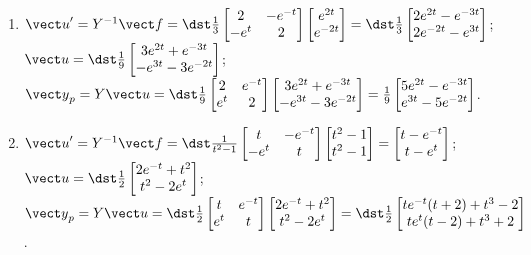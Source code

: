 \documentclass[openany]{book}
\newenvironment{sectionSolutions}{
 \begin{enumerate}[item-label={\thesection.\arabic{enumi}.}]
}{
 \end{enumerate}
}
\begin{document}
\begin{sectionSolutions}
\item
${\vect u}'=Y^{-1}{\vect f}=
\dst\frac{1}{3}\begin{bmatrix}2&-e^{-t}\\-e^t&2\end{bmatrix}
\begin{bmatrix}e^{2t}\\e^{-2t}\end{bmatrix}=
\dst\frac{1}{3}\begin{bmatrix}
2e^{2t}-e^{-3t}\\2e^{-2t}-e^{3t}\end{bmatrix}$;
${\vect u}=
\dst\frac{1}{9}\begin{bmatrix}
3e^{2t}+e^{-3t}\\-e^{3t}-3e^{-2t}\end{bmatrix}$;
${\vect y}_p=Y{\vect u}=
\dst\frac{1}{9}\begin{bmatrix}
2&e^{-t}\\e^t&2\end{bmatrix}
\begin{bmatrix}
3e^{2t}+e^{-3t}\\-e^{3t}-3e^{-2t}\end{bmatrix}=
\frac{1}{9}\begin{bmatrix}
5e^{2t}-e^{-3t}\\e^{3t}-5e^{-2t}\end{bmatrix}$.


\item
${\vect u}'=Y^{-1}{\vect f}=
\dst\frac{1}{ t^2-1}\begin{bmatrix}t&-e^{-t}\\-e^t&t\end{bmatrix}
\begin{bmatrix}t^2-1\\t^2-1\end{bmatrix}=
\begin{bmatrix}t-e^{-t}\\t-e^t\end{bmatrix}$;
${\vect u}=
\dst\frac{1}{2}\begin{bmatrix}
2e^{-t}+t^2\\t^2-2e^t\end{bmatrix}$;
${\vect y}_p=Y{\vect u}
=\dst\frac{1}{2}\begin{bmatrix}t&e^{-t}\\e^t&t\end{bmatrix}
\begin{bmatrix}
2e^{-t}+t^2\\t^2-2e^t\end{bmatrix}=
\dst\frac{1}{2}\begin{bmatrix}
te^{-t}(t+2)+t^3-2\\te^t(t-2)+t^3+2\end{bmatrix}$.



\end{sectionSolutions}
\end{document}

